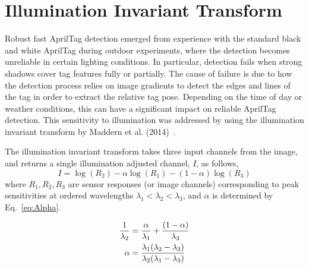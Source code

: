 \newpage
\section{Illumination Invariant Transform}

Robust fast AprilTag detection emerged from experience with the standard black
and white AprilTag during outdoor experiments, where the detection becomes
unreliable in certain lighting conditions. In particular, detection fails when
strong shadows cover tag features fully or partially. The cause of failure is
due to how the detection process relies on image gradients to detect the edges
and lines of the tag in order to extract the relative tag pose. Depending on
the time of day or weather conditions, this can have a significant impact on
reliable AprilTag detection. This sensitivity to illumination was addressed by
using the illumination invariant transform by Maddern et al.
(2014)~\cite{Maddern2014}.

The illumination invariant transform takes three input channels from the
image, and returns a single illumination adjusted channel, $I$, as follows,
%
\begin{equation}
\label{eq:illlum_invar}
I = \log(R_{2}) - \alpha \log(R_{1}) - (1 - \alpha) \log(R_{3})
\end{equation}
%
where $R_{1}, R_{2}, R_{3}$ are sensor responses (or image channels)
corresponding to peak sensitivities at ordered wavelengths $\lambda_{1} <
\lambda_{2} < \lambda_{3}$, and $\alpha$ is determined by Eq.~\eqref{eq:Alpha}.

\begin{equation}
	\label{eq:Alpha}
	\begin{split}
		\dfrac{1}{\lambda_{2}} &=
		\dfrac{\alpha}{\lambda_{1}}
		+ \dfrac{\left(1 - \alpha \right)}{\lambda_{3}} \vspace{2.0em} \\ 
		\alpha &= \dfrac{\lambda_{1} (\lambda_{2} - \lambda_{3})}
		{\lambda_{2} (\lambda_{1} - \lambda_{3})}
	\end{split}
\end{equation}

